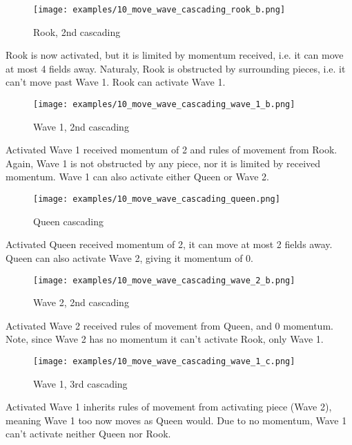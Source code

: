 \vspace*{0.075\textheight}
\noindent
\begin{wrapfigure}[9]{r}{0.5625\textwidth}
\centering
\texttt{[image: examples/10\_move\_wave\_cascading\_rook\_b.png]}
\caption{Rook, 2nd cascading}
\label{fig:10_move_wave_cascading_rook_b}
\end{wrapfigure}
Rook is now activated, but it is limited by momentum received, i.e. it can
move at most 4 fields away. Naturaly, Rook is obstructed by surrounding pieces,
i.e. it can't move past Wave 1. Rook can activate Wave 1.

\clearpage %

\noindent
\begin{wrapfigure}[10]{l}{0.5625\textwidth}
\centering
\texttt{[image: examples/10\_move\_wave\_cascading\_wave\_1\_b.png]}
\caption{Wave 1, 2nd cascading}
\label{fig:10_move_wave_cascading_wave_1_b}
\end{wrapfigure}
Activated Wave 1 received momentum of 2 and rules of movement from Rook. Again,
Wave 1 is not obstructed by any piece, nor it is limited by received momentum.
Wave 1 can also activate either Queen or Wave 2.

\vspace*{0.155\textheight}
\noindent
\begin{wrapfigure}[10]{r}{0.5625\textwidth}
\centering
\texttt{[image: examples/10\_move\_wave\_cascading\_queen.png]}
\caption{Queen cascading}
\label{fig:10_move_wave_cascading_queen}
\end{wrapfigure}
Activated Queen received momentum of 2, it can move at most 2 fields away.
Queen can also activate Wave 2, giving it momentum of 0.

\clearpage %

\noindent
\begin{wrapfigure}[7]{l}{0.5625\textwidth}
\centering
\texttt{[image: examples/10\_move\_wave\_cascading\_wave\_2\_b.png]}
\caption{Wave 2, 2nd cascading}
\label{fig:10_move_wave_cascading_wave_2_b}
\end{wrapfigure}
Activated Wave 2 received rules of movement from Queen, and 0 momentum.
Note, since Wave 2 has no momentum it can't activate Rook, only Wave 1.

\vspace*{0.245\textheight}
\noindent
\begin{wrapfigure}[9]{r}{0.5625\textwidth}
\centering
\texttt{[image: examples/10\_move\_wave\_cascading\_wave\_1\_c.png]}
\caption{Wave 1, 3rd cascading}
\label{fig:10_move_wave_cascading_wave_1_c}
\end{wrapfigure}
Activated Wave 1 inherits rules of movement from activating piece (Wave 2),
meaning Wave 1 too now moves as Queen would. Due to no momentum, Wave 1 can't
activate neither Queen nor Rook.

